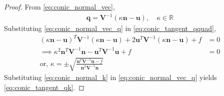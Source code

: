 \documentclass[]{interact}
\theoremstyle{plain}%
\theoremstyle{definition}
\theoremstyle{remark}
\providecommand{\brak}[1]{\ensuremath{\left(#1\right)}}
\let\vec\mathbf
\begin{document}
\begin{proof}
  From \eqref{eq:conic_normal_vec},
\begin{align}
\label{eq:conic_normal_vec_q}
 \vec{q} = \vec{V}^{-1}\brak{\kappa \vec{n}-\vec{u}}, \quad \kappa \in \mathbb{R}
\end{align}
Substituting \eqref{eq:conic_normal_vec_q}
in \eqref{eq:conic_tangent_qquad},
\begin{align}
\brak{\kappa \vec{n}-\vec{u}}^T\vec{V}^{-1}\brak{\kappa \vec{n}-\vec{u}} 
+ 2\vec{u}^T\vec{V}^{-1}\brak{\kappa \vec{n}-\vec{u}} +f &= 0
\\
\implies 
\kappa^2 \vec{n}^T\vec{V}^{-1}\vec{n} - \vec{u}^T\vec{V}^{-1}\vec{u} + f &=0
 \\
 \text{or, } \kappa = \pm \sqrt{\frac{\vec{u}^T\vec{V}^{-1}\vec{u}-f}{\vec{n}^T\vec{V}^{-1}\vec{n}}} &\label{eq:conic_normal_k}
\end{align}
%
Substituting \eqref{eq:conic_normal_k} in \eqref{eq:conic_normal_vec_q}
yields \eqref{eq:conic_tangent_qk}.
%
\end{proof}
\end{document}
